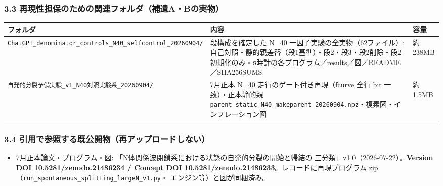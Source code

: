 \documentclass[
  a4paper,
]{ltjsarticle}
\newcounter{none} %
\providecommand{\tightlist}{%
  \setlength{\itemsep}{0pt}\setlength{\parskip}{0pt}}
\begin{document}
\subsubsection{3.3
再現性担保のための関連フォルダ（補遺A・Bの実物）}\label{ux518dux73feux6027ux62c5ux4fddux306eux305fux3081ux306eux95a2ux9023ux30d5ux30a9ux30ebux30c0ux88dcux907aabux306eux5b9fux7269}

{\def\LTcaptype{none} %
\begin{longtable}[]{@{}
  >{\raggedright\arraybackslash}p{}
  >{\raggedright\arraybackslash}p{}
  >{\raggedright\arraybackslash}p{}@{}}
\toprule\noalign{}
\begin{minipage}[b]{\linewidth}\raggedright
フォルダ
\end{minipage} & \begin{minipage}[b]{\linewidth}\raggedright
内容
\end{minipage} & \begin{minipage}[b]{\linewidth}\raggedright
容量
\end{minipage} \\
\midrule\noalign{}
\endhead
\bottomrule\noalign{}
\endlastfoot
\texttt{ChatGPT\_denominator\_controls\_N40\_selfcontrol\_20260904/} &
段構成を確定した N=40 一因子実験の全実物（62ファイル）:
自己対照・静的親差替（段1基準）・段2・段3・段2削除・段2初期化のみ・σ時計の各プログラム／results／図／README／SHA256SUMS
& 約238MB \\
\texttt{自発的分裂予備実験\_v1\_N40対照実験系\_20260904/} & 7月正本 N=40
走行のゲート付き再現（fcurve 全行 bit 一致）・正本静的親
\texttt{parent\_static\_N40\_makeparent\_20260904.npz}・複素図・インフレーション図
& 約1.5MB \\
\end{longtable}
}

\subsubsection{3.4
引用で参照する既公開物（再アップロードしない）}\label{ux5f15ux7528ux3067ux53c2ux7167ux3059ux308bux65e2ux516cux958bux7269ux518dux30a2ux30c3ux30d7ux30edux30fcux30c9ux3057ux306aux3044}

\begin{itemize}
\tightlist
\item
  7月正本論文・プログラム・図:
  「N体関係波閉鎖系における状態の自発的分裂の開始と帰結の
  三分類」v1.0（2026-07-22）。\textbf{Version DOI
  10.5281/zenodo.21486234 / Concept DOI
  10.5281/zenodo.21486233}。レコードに再現プログラム
  zip（\texttt{run\_spontaneous\_splitting\_largeN\_v1.py}・
  エンジン等）と図が同梱済み。
\end{itemize}
\end{document}
